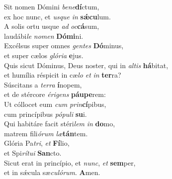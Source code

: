 \evenverse Sit nomen Dómini \textit{be}\textit{ne}\textbf{dí}ctum,~\*\\
\evenverse ex hoc nunc, et \textit{us}\textit{que} \textit{in} \textbf{sǽ}\textbf{cu}lum.\\
\oddverse A solis ortu usque \textit{ad} \textit{oc}\textbf{cá}sum,~\*\\
\oddverse laudábi\textit{le} \textit{no}\textit{men} \textbf{Dó}\textbf{mi}ni.\\
\evenverse Excélsus super omnes \textit{gen}\textit{tes} \textbf{Dó}minus,~\*\\
\evenverse et super cælos \textit{gló}\textit{ri}\textit{a} \textbf{e}jus.\\
\oddverse Quis sicut Dóminus, Deus noster, qui in \textit{al}\textit{tis} \textbf{há}bitat,~\*\\
\oddverse et humília réspicit in cæ\textit{lo} \textit{et} \textit{in} \textbf{ter}ra?\\
\evenverse Súscitans a \textit{ter}\textit{ra} \textbf{í}nopem,~\*\\
\evenverse et de stércore \textit{é}\textit{ri}\textit{gens} \textbf{páu}\textbf{pe}rem:\\
\oddverse Ut cóllocet eum \textit{cum} \textit{prin}\textbf{cí}pibus,~\*\\
\oddverse cum princípibus \textit{pó}\textit{pu}\textit{li} \textbf{su}i.\\
\evenverse Qui habitáre facit stéri\textit{lem} \textit{in} \textbf{do}mo,~\*\\
\evenverse matrem fili\textit{ó}\textit{rum} \textit{læ}\textbf{tán}tem.\\
\oddverse Glória Pa\textit{tri}, \textit{et} \textbf{Fí}lio,~\*\\
\oddverse et Spi\textit{rí}\textit{tu}\textit{i} \textbf{San}cto.\\
\evenverse Sicut erat in princípio, et \textit{nunc}, \textit{et} \textbf{sem}per,~\*\\
\evenverse et in sǽcula sæ\textit{cu}\textit{ló}\textit{rum}. \textbf{A}men.\\
